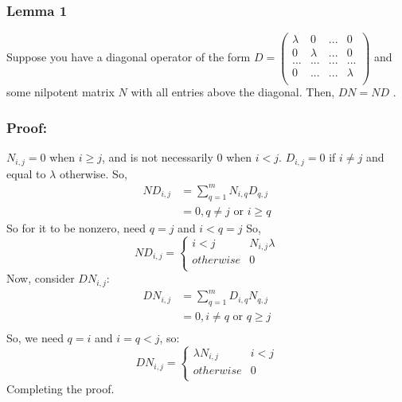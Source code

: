 \documentclass{article}
\begin{document}
\subsubsection*{Lemma 1}
Suppose you have a diagonal operator of the form $D =
\begin{pmatrix}
\lambda & 0 & ... & 0\\
0 & \lambda & ... & 0\\
... &... &... & ...\\
0 & ... & ... & \lambda\\
\end{pmatrix}
$ and some nilpotent matrix $N$ with all entries above the diagonal. Then, $DN = ND$ .
\subsubsection*{Proof:}
$N_{i,j} = 0$ when $i \geq j$, and is not necessarily 0 when $i < j$. $D_{i,j} = 0$ if $i \neq j$ and equal to $\lambda$ otherwise. So, 
\begin{align*}
ND_{i,j} &= \sum_{q = 1}^{m} N_{i, q}D_{q, j}\\
&=0, q \neq j \text{ or } i \geq q
\end{align*}
So for it to be nonzero, need $q = j$ and $i < q = j$ So,
 \[ ND_{i, j} = \begin{cases}
		 i < j & N_{i,j}\lambda\\
		otherwise & 0\\
		\end{cases}
		\]
Now, consider $DN_{i,j}$:
\begin{align*}
DN_{i,j} &= \sum_{q=1}^{m} D_{i, q}N_{q, j}\\
&= 0, i \neq q \text{ or } q \geq j\\
\end{align*}
So, we need $q = i$ and $i = q < j$, so:
\[ DN_{i, j} = \begin{cases}
		 \lambda N_{i,j} & i < j\\
		otherwise & 0\\
		\end{cases}
		\]
Completing the proof.
\end{document}
